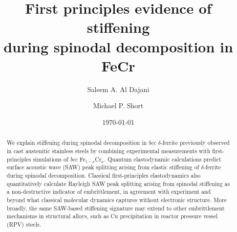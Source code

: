 \documentclass[final,3p,times]{elsarticle}
\begin{document}
\begin{frontmatter}


\title
{
\textbf
{
First principles evidence of stiffening \\ during spinodal decomposition in FeCr
}
}


\date
{\today}
\rhead{\today}



\author[1]{Saleem A. Al Dajani}
\author[1]{Michael P. Short}

\address{
Department of Nuclear Science and Engineering \\
Massachusetts Institute of Technology\\
77 Massachusetts Avenue \\
Cambridge, MA 02139}

\address[1]
{
Corresponding Author: \href{mailto:sdajani@mit.edu}{\texttt{sdajani@mit.edu}}
}
\begin{abstract}

We explain stiffening during spinodal decomposition in \emph{bcc} $\delta$-ferrite previously observed in cast austenitic stainless steels by combining experimental measurements with first-principles simulations of \emph{bcc} Fe$_{1-x}$Cr$_x$. Quantum elastodynamic calculations predict surface acoustic wave (SAW) peak splitting arising from elastic stiffening of $\delta$-ferrite during spinodal decomposition. Classical first-principles elastodynamics also quantitatively calculate Rayleigh SAW peak splitting arising from spinodal stiffening as a non-destructive indicator of embrittlement, in agreement with experiment and beyond what classical molecular dynamics captures without electronic structure. More broadly, the same SAW-based stiffening signature may extend to other embrittlement mechanisms in structural alloys, such as Cu precipitation in reactor pressure vessel (RPV) steels.


\end{abstract}
\end{frontmatter}
\end{document}
